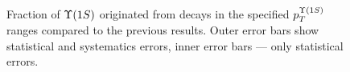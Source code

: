 \begin{figure}[H]
  \setlength{\unitlength}{1mm}
  \centering
  \caption{\small
    Fraction of $\Y1S$ originated from \chibOneP decays in the specified
    $p_T^{\Y1S}$ ranges compared to the previous results. Outer error bars show
    statistical and systematics errors, inner error bars --- only statistical
    errors. }
  \label{fig:results_2010}
\end{figure}